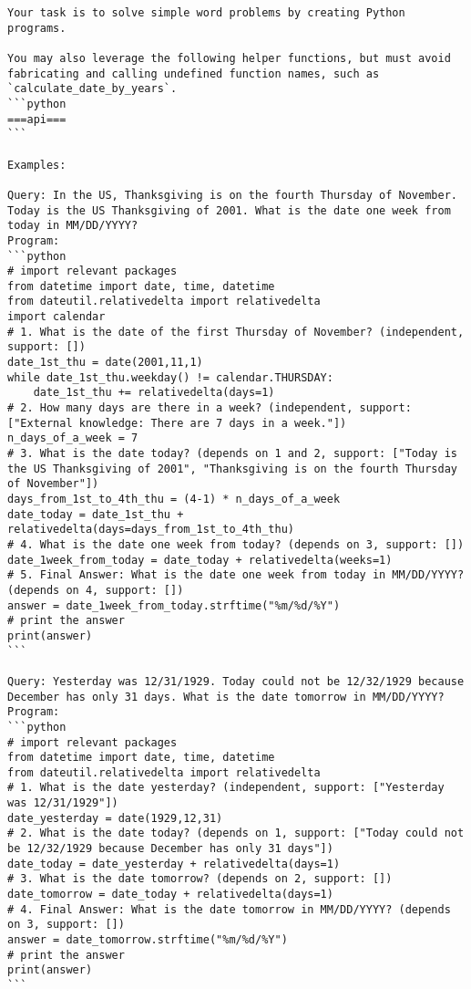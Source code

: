 \begin{tcolorbox}[title=Prompt on Date, breakable, width=\textwidth,top=0mm]
\begin{Verbatim}[breaklines, fontsize=\footnotesize]
Your task is to solve simple word problems by creating Python programs.

You may also leverage the following helper functions, but must avoid fabricating and calling undefined function names, such as `calculate_date_by_years`.
```python
===api===
```

Examples:

Query: In the US, Thanksgiving is on the fourth Thursday of November. Today is the US Thanksgiving of 2001. What is the date one week from today in MM/DD/YYYY?
Program:
```python
# import relevant packages
from datetime import date, time, datetime
from dateutil.relativedelta import relativedelta
import calendar
# 1. What is the date of the first Thursday of November? (independent, support: [])
date_1st_thu = date(2001,11,1)
while date_1st_thu.weekday() != calendar.THURSDAY:
    date_1st_thu += relativedelta(days=1)
# 2. How many days are there in a week? (independent, support: ["External knowledge: There are 7 days in a week."])
n_days_of_a_week = 7
# 3. What is the date today? (depends on 1 and 2, support: ["Today is the US Thanksgiving of 2001", "Thanksgiving is on the fourth Thursday of November"])
days_from_1st_to_4th_thu = (4-1) * n_days_of_a_week
date_today = date_1st_thu + relativedelta(days=days_from_1st_to_4th_thu)
# 4. What is the date one week from today? (depends on 3, support: [])
date_1week_from_today = date_today + relativedelta(weeks=1)
# 5. Final Answer: What is the date one week from today in MM/DD/YYYY? (depends on 4, support: [])
answer = date_1week_from_today.strftime("%m/%d/%Y")
# print the answer
print(answer)
```

Query: Yesterday was 12/31/1929. Today could not be 12/32/1929 because December has only 31 days. What is the date tomorrow in MM/DD/YYYY?
Program:
```python
# import relevant packages
from datetime import date, time, datetime
from dateutil.relativedelta import relativedelta
# 1. What is the date yesterday? (independent, support: ["Yesterday was 12/31/1929"])
date_yesterday = date(1929,12,31)
# 2. What is the date today? (depends on 1, support: ["Today could not be 12/32/1929 because December has only 31 days"])
date_today = date_yesterday + relativedelta(days=1)
# 3. What is the date tomorrow? (depends on 2, support: [])
date_tomorrow = date_today + relativedelta(days=1)
# 4. Final Answer: What is the date tomorrow in MM/DD/YYYY? (depends on 3, support: [])
answer = date_tomorrow.strftime("%m/%d/%Y")
# print the answer
print(answer)
```


\end{Verbatim}
\end{tcolorbox}
